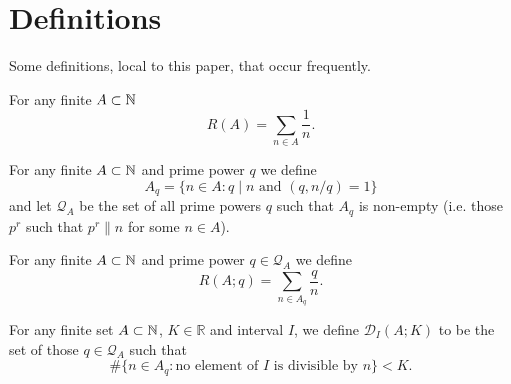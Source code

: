 \chapter{Definitions}
\label{chap:def}

Some definitions, local to this paper, that occur frequently.

\begin{definition}
  \label{def:rec_sum}
  \leanok
  For any finite $A\subset \mathbb{N}$
  \[R(A)=\sum_{n\in A}\frac{1}{n}.\]
\end{definition}

\begin{definition}
  \label{def:local_part}
  \leanok
  For any finite $A\subset \mathbb{N}$ and prime power $q$ we define
  \[A_q = \{ n\in A : q\mid n\textrm{ and }(q,n/q)=1\}\]
  and let $\mathcal{Q}_A$ be the set of all prime powers $q$ such that $A_q$ is non-empty (i.e. those $p^r$ such that $p^r\| n$ for some $n\in A$).
\end{definition}

\begin{definition}
  \label{def:rec_sum_local}
  \leanok
  For any finite $A\subset \mathbb{N}$ and prime power $q\in\mathcal{Q}_A$ we define
  \[R(A;q) = \sum_{n\in A_q}\frac{q}{n}.\]
\end{definition}

\begin{definition}
  \label{def:interval_rare_ppowers}
  \leanok
  For any finite set $A\subset \mathbb{N}$, $K\in \mathbb{R}$ and interval $I$, we define $\mathcal{D}_I(A;K)$ to be the set of those $q\in\mathcal{Q}_A$ such that
\[\#\{ n\in A_q: \textrm{no element of }I\textrm{ is divisible by }n\} < K.\]
\end{definition}
